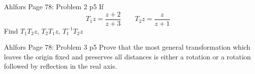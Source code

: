 \documentclass[a4paper, 11pt]{article}
\begin{document}
	
	\begin{problem}{%
			Ahlfors Page 78: Problem 2
		}{p5%
		}
		If $$T_{1}z=\frac{z+2}{z+3}\qquad T_{2}z=\frac{z}{z+1}$$Find $T_1T_{2}z$, $T_{2}T_{1}z$, $T_1^{-1}T_{2}z$
		
	\end{problem}
	
	
	\begin{problem}{%
			Ahlfors Page 78: Problem 3
		}{p5%
		}
		Prove that the most general transformation which leaves the origin fixed and preserves all distances is either a rotation or a rotation followed by reflection in the real axis.
		
	\end{problem}
	
\end{document}

